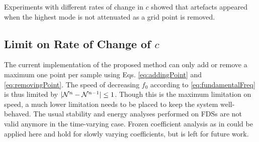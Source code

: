Experiments with different rates of change in $c$ showed that artefacts appeared when the highest mode is not attenuated as a grid point is removed.

\subsection{Limit on Rate of Change of $c$}
The current implementation of the proposed method can only add or remove a maximum one point per sample using Eqs. \eqref{eq:addingPoint} and \eqref{eq:removingPoint}. The speed of decreasing $f_0$ according to \eqref{eq:fundamentalFreq} is thus limited by $|\mathcal{N}^n - \mathcal{N}^{n-1}| \leq 1$. Though this is the maximum limitation on speed, a much lower limitation needs to be placed to keep the system well-behaved. The usual stability and energy analyses performed on FDSs are not valid anymore in the time-varying case. Frozen coefficient analysis as in \cite{Strikwerda1989} could be applied here and hold for slowly varying coefficients, but is left for future work. 

